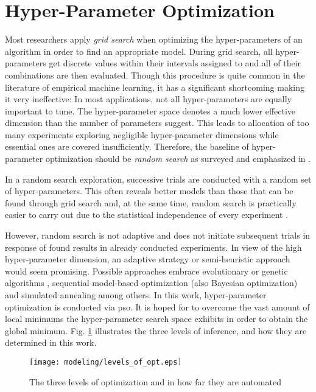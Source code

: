 \section{Hyper-Parameter Optimization}
\label{sec:pso}
Most researchers apply \textit{grid search} when optimizing the hyper-parameters of an algorithm in order to find an appropriate model.
During grid search, all hyper-parameters get discrete values within their intervals assigned to and all of their combinations are then evaluated.
Though this procedure is quite common in the literature of empirical machine learning, it has a significant shortcoming making it very ineffective:
In most applications, not all hyper-parameters are equally important to tune.
The hyper-parameter space denotes a much lower effective dimension than the number of parameters suggest.
This leads to allocation of too many experiments exploring negligible hyper-parameter dimensions while essential ones are covered insufficiently.
Therefore, the baseline of hyper-parameter optimization should be \textit{random search} as surveyed and emphasized in \cite{BeBe2012}.

In a random search exploration, successive trials are conducted with a random set of hyper-parameters.
This often reveals better models than those that can be found through grid search and, at the same time, random search is practically easier to carry out due to the statistical independence of every experiment \cite{BeBe2012}.

However, random search is not adaptive and does not initiate subsequent trials in response of found results in already conducted experiments.
In view of the high hyper-parameter dimension, an adaptive strategy or semi-heuristic approach would seem promising.
Possible approaches embrace evolutionary or genetic algorithms \cite{GoSa1986}, sequential model-based optimization (also Bayesian optimization) \cite{HuHo2011} and simulated annealing \cite{Kirkpatrick1984} among others.
In this work, hyper-parameter optimization is conducted via \gls{pso}.
It is hoped for to overcome the vast amount of local minimums the hyper-parameter search space exhibits in order to obtain the global minimum.
Fig. \ref{fig:opt_levels} illustrates the three levels of inference, and how they are determined in this work.
\begin{figure}
	\centering
	\texttt{[image: modeling/levels\_of\_opt.eps]}
	\caption{The three levels of optimization and in how far they are automated}
	\label{fig:opt_levels}
\end{figure}

